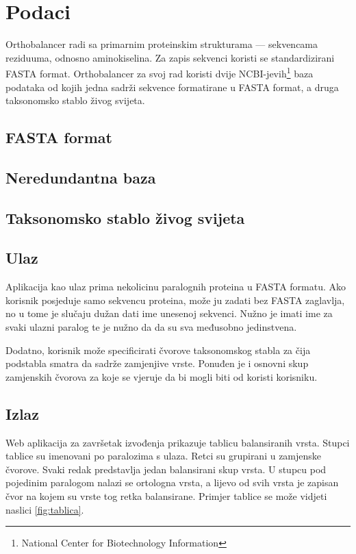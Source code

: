 \chapter{Podaci}
\label{chap:podaci}

Orthobalancer radi sa primarnim proteinskim strukturama --- sekvencama
reziduuma, odnosno aminokiselina. Za zapis sekvenci koristi se standardizirani
FASTA format. Orthobalancer za svoj rad koristi dvije
NCBI-jevih\footnote{National Center for Biotechnology Information} baza
podataka od kojih jedna sadrži sekvence formatirane u FASTA format, a druga
taksonomsko stablo živog svijeta.


\section{FASTA format}


\section{Neredundantna baza}


\section{Taksonomsko stablo živog svijeta}


\section{Ulaz}

Aplikacija kao ulaz prima nekolicinu paralognih proteina u FASTA formatu. Ako
korisnik posjeduje samo sekvencu proteina, može ju zadati bez FASTA zaglavlja,
no u tome je slučaju dužan dati ime unesenoj sekvenci. Nužno je imati ime za svaki
ulazni paralog te je nužno da da su sva međusobno jedinstvena.

Dodatno, korisnik može specificirati čvorove taksonomskog stabla za čija
podstabla smatra da sadrže zamjenjive vrste. Ponuđen je i osnovni skup
zamjenskih čvorova za koje se vjeruje da bi mogli biti od koristi korisniku.


\section{Izlaz}

Web aplikacija za završetak izvođenja prikazuje tablicu balansiranih vrsta.
Stupci tablice su imenovani po paralozima s ulaza. Retci su grupirani u
zamjenske čvorove. Svaki redak predstavlja jedan balansirani skup vrsta. U
stupcu pod pojedinim paralogom nalazi se ortologna vrsta, a lijevo od svih vrsta
je zapisan čvor na kojem su vrste tog retka balansirane. Primjer tablice se može
vidjeti naslici \ref{fig:tablica}.

